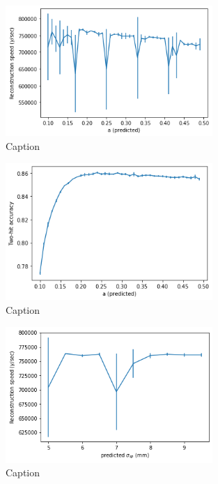 \begin{figure}
    \centering
    \includegraphics[width=0.7\textwidth]{graphs/pi_enFactor_speed.png}
    \caption{Caption}
    \label{fig:my_label}
\end{figure}

\begin{figure}
    \centering
    \includegraphics[width=0.7\textwidth]{graphs/pi_enFactor_acc.png}
    \caption{Caption}
    \label{fig:my_label}
\end{figure}

\begin{figure}
    \centering
    \includegraphics[width=0.7\textwidth]{graphs/pi_spFactor_speed.png}
    \caption{Caption}
    \label{fig:my_label}
\end{figure}

